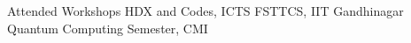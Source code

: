 \begin{rubric}{Attended Workshops}
	\entry*[2025] HDX and Codes, ICTS
	\entry*[2024] FSTTCS, IIT Gandhinagar
	 Quantum Computing Semester, CMI
\end{rubric}